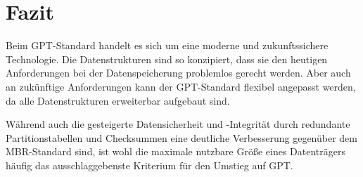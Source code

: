 \section{Fazit}
Beim GPT-Standard handelt es sich um eine moderne und zukunftssichere Technologie.
Die Datenstrukturen sind so konzipiert, dass sie den heutigen Anforderungen bei der Datenspeicherung problemlos gerecht werden.
Aber auch an zukünftige Anforderungen kann der GPT-Standard flexibel angepasst werden, da alle Datenstrukturen erweiterbar aufgebaut sind.

Während auch die gesteigerte Datensicherheit und -Integrität durch redundante Partitionstabellen und Checksummen eine deutliche Verbesserung gegenüber dem MBR-Standard sind, ist wohl die maximale nutzbare Größe eines Datenträgers häufig das ausschlaggebenste Kriterium für den Umstieg auf GPT.

